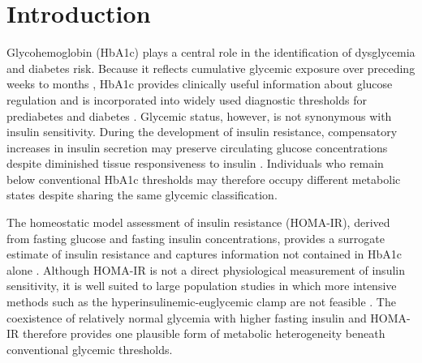 \documentclass[11pt]{article}
\begin{document}
\begin{abstract}
\textbf{Conclusions:}
Among U.S. adults without diagnosed diabetes and with HbA1c below the
conventional prediabetes threshold, the adjusted association between
HOMA-IR and systemic inflammation varied across age. These findings suggest
that adults with HbA1c $<5.7\%$ remain metabolically heterogeneous and that
variation in insulin resistance may provide information about inflammatory
physiology not captured by glycemic classification alone. Prospective
studies are needed to determine whether measuring insulin resistance adds
clinically useful information to conventional glycemic assessment and
whether such utility varies with age.

\end{abstract}

\section{Introduction}

Glycohemoglobin (HbA1c) plays a central role in the identification of
dysglycemia and diabetes risk. Because it reflects cumulative glycemic
exposure over preceding weeks to months \citep{Nathan2007}, HbA1c provides clinically useful
information about glucose regulation and is incorporated into widely used
diagnostic thresholds for prediabetes and diabetes \citep{ADA2026Diagnosis}. Glycemic status,
however, is not synonymous with insulin sensitivity. During the development
of insulin resistance, compensatory increases in insulin secretion may
preserve circulating glucose concentrations despite diminished tissue
responsiveness to insulin \citep{Rodzen2026}. Individuals who remain below conventional HbA1c
thresholds may therefore occupy different metabolic states despite sharing
the same glycemic classification.

The homeostatic model assessment of insulin resistance (HOMA-IR), derived
from fasting glucose and fasting insulin concentrations, provides a
surrogate estimate of insulin resistance and captures information not
contained in HbA1c alone \citep{Matthews1985,Wallace2004}. Although HOMA-IR is not a direct physiological
measurement of insulin sensitivity, it is well suited to large population
studies in which more intensive methods such as the
hyperinsulinemic-euglycemic clamp are not feasible \citep{DeFronzo1979,Wallace2004}. The coexistence of
relatively normal glycemia with higher fasting insulin and HOMA-IR therefore
provides one plausible form of metabolic heterogeneity beneath conventional
glycemic thresholds.
\end{document}
